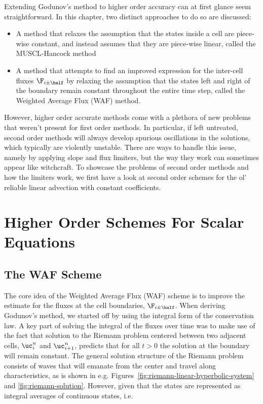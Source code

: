 Extending Godunov's method to higher order accuracy can at first glance seem straightforward. In
this chapter, two distinct approaches to do so are discussed:

\begin{itemize}
\item A method that relaxes the assumption that the states inside a cell are piece-wise constant,
and instead assumes that they are piece-wise linear, called the MUSCL-Hancock method
\item A method that attempts to find an improved expression for the inter-cell fluxes $\F_{i\pm
\half}$ by relaxing the assumption that the states left and right of the boundary remain constant
throughout the entire time step, called the Weighted Average Flux (WAF) method.
\end{itemize}


However, higher order accurate methods come with a plethora of new problems that weren't present
for first order methods. In particular, if left untreated, second order methods will always develop
spurious oscillations in the solutions, which typically are violently unstable. There are ways to
handle this issue, namely by applying slope and flux limiters, but the way they work can sometimes
appear like witchcraft. To showcase the problems of second order methods and how the limiters work,
we first have a look at second order schemes for the ol' reliable linear advection with constant
coefficients.



\section{Higher Order Schemes For Scalar Equations}



\subsection{The WAF Scheme}\label{chap:WAF}

The core idea of the Weighted Average Flux (WAF) scheme is to improve the estimate for the fluxes
at the cell boundaries, $\F_{i \pm \half}$.
When deriving Godunov's method, we started off by using the integral form of the conservation law.
A key part of solving the integral of the fluxes over time was to make use of the fact that
solution to the Riemann problem centered between two adjacent cells, $\uc_i^n$ and $\uc_{i+1}^n$,
predicts that for all $t > 0$ the solution at the boundary will remain constant.
The general solution structure of the Riemann problem consists of waves that will emanate from the
center and travel along characteristics, as is shown in e.g.
Figures~\ref{fig:riemann-linear-hyperbolic-system} and \ref{fig:riemann-solution}. However, given
that the states are represented as integral averages of continuous states, i.e.

